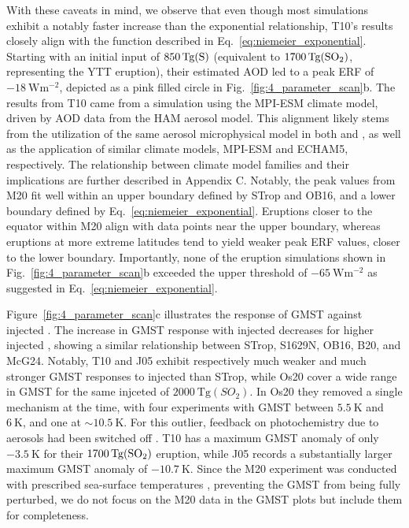 \documentclass[draft]{agujournal2019}
\begin{document}
  With these caveats in mind, we observe that even though most simulations exhibit a
  notably faster increase than the exponential relationship, T10's results closely align
  with the function described in Eq.~\ref{eq:niemeier_exponential}. Starting with an
  initial input of \(\SI{850}{\tera\gram(\ce{S})}\) (equivalent to
  \(\SI{1700}{\tera\gram(\ce{SO2})}\), representing the YTT eruption), their estimated
  AOD led to a peak ERF of \(\SI{-18}{\watt\meter^{-2}}\), depicted as a pink filled
  circle in Fig.~\ref{fig:4_parameter_scan}b. The results from T10 came from a
  simulation using the MPI-ESM climate model, driven by AOD data from the HAM aerosol
  model. This alignment likely stems from the utilization of the same aerosol
  microphysical model in both  and , as well as
  the application of similar climate models, MPI-ESM and ECHAM5, respectively. The
  relationship between climate model families and their implications are further
  described in Appendix C. Notably, the peak values from M20 fit well within an upper
  boundary defined by STrop and OB16, and a lower boundary defined by
  Eq.~\ref{eq:niemeier_exponential}. Eruptions closer to the equator within M20 align
  with data points near the upper boundary, whereas eruptions at more extreme latitudes
  tend to yield weaker peak ERF values, closer to the lower boundary. Importantly, none
  of the eruption simulations shown in Fig.~\ref{fig:4_parameter_scan}b exceeded the
  upper threshold of \(\SI{-65}{\watt\meter^{-2}}\) as suggested in
  Eq.~\ref{eq:niemeier_exponential}.

  Figure~\ref{fig:4_parameter_scan}c illustrates the response of GMST against injected
  . The increase in GMST response with injected  decreases for higher
  injected , showing a similar relationship between STrop, S1629N, OB16, B20,
  and McG24. Notably, T10 and J05 exhibit respectively much weaker and much stronger
  GMST responses to injected  than STrop, while Os20 cover a wide range in GMST
  for the same injceted  of \(\SI{2000}{\tera\gram(SO_{2})}\). In Os20 they
  removed a single mechanism at the time, with four experiments with GMST between
  \(\SI{5.5}{\kelvin}\) and \(\SI{6}{\kelvin}\), and one at \(\sim \SI{10.5}{\kelvin}\).
  For this outlier, feedback on photochemistry due to aerosols had been switched off
  \cite{osipov2020}. T10 has a maximum GMST anomaly of only \(\SI{-3.5}{\kelvin}\) for
  their \(\SI{1700}{\tera\gram(\ce{SO2})}\) eruption, while J05 records a substantially
  larger maximum GMST anomaly of \(\SI{-10.7}{\kelvin}\). Since the M20 experiment was
  conducted with prescribed sea-surface temperatures \cite{marshall2020}, preventing the
  GMST from being fully perturbed,  we do not focus on the M20
  data in the GMST plots but include them for completeness.
\end{document}
